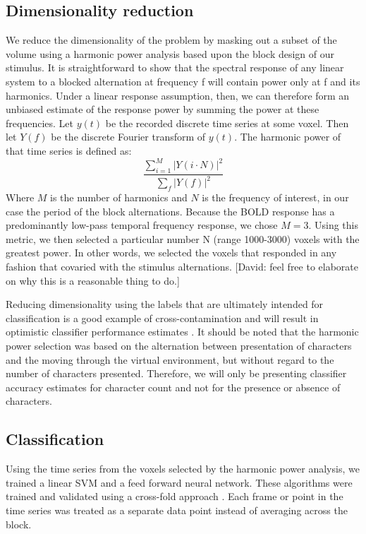 \documentclass[final]{article}
\begin{document}
\subsection{Dimensionality reduction}
We reduce the dimensionality of the problem by masking out a subset of the volume using a harmonic 
power analysis based upon the block design of our stimulus. It is 
straightforward to show that the spectral response of any linear system to a blocked 
alternation at frequency f will contain power only at f and its harmonics. Under a linear response 
assumption, then, we can therefore form an unbiased estimate of the response power by 
summing the power at these frequencies. 
Let $y(t)$ be the recorded discrete time series at some voxel.
Then let $Y(f)$ be the discrete Fourier transform of $y(t)$.
The harmonic power of that time series is defined as:
\begin{equation}
\frac{\sum_{i = 1}^{M}{\left|Y(i \cdot N)\right|^{2}}}{\sum_{f}{\left|Y(f)\right|^{2}}}
\end{equation}
Where $M$ is the number of harmonics and $N$ is the frequency of interest, in our case the period of 
the block alternations. Because the BOLD response has a predominantly low-pass 
temporal frequency response, we chose $M = 3$. Using this metric, we then selected a particular number 
N (range 1000-3000) voxels with the greatest power. In other words, we selected the voxels that 
responded in any fashion that covaried with the stimulus alternations.
[David: feel free to elaborate on why this is a reasonable thing to do.]

Reducing dimensionality using the labels that are ultimately intended for classification is a good example of cross-contamination and will result in optimistic classifier performance estimates \cite{CrossContamination}.
It should be noted that the harmonic power selection was based on the alternation between presentation of characters and the moving through the virtual environment, but without regard to the number of characters presented.
Therefore, we will only be presenting classifier accuracy estimates for character count and not for the presence or absence of characters.

\subsection{Classification}
Using the time series from the voxels selected by the harmonic power analysis, we trained a linear SVM and a feed forward neural network.
These algorithms were trained and validated using a cross-fold approach \cite{Kohavi1995}.
Each frame or point in the time series was treated as a separate data point instead of averaging across the block.
\end{document}
